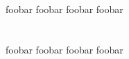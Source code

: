 \section{\result}
\label{cha:result}
foobar foobar foobar foobar 
\section{\lookout}
\label{cha:lookout}
foobar foobar foobar foobar 
